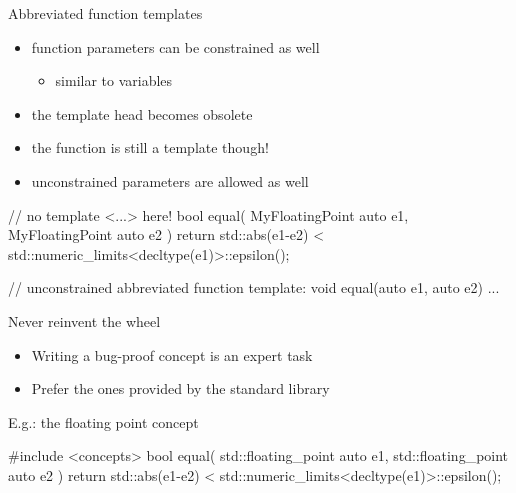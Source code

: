 \begin{frame}[fragile]
    \begin{block}{Abbreviated function templates}
      \begin{itemize}
        \item function parameters can be constrained as well
        \begin{itemize}
          \item similar to variables
        \end{itemize}
        \item the template head becomes obsolete
        \item the function is still a template though!
        \item unconstrained  parameters are allowed as well
      \end{itemize}
    \end{block}
    \begin{exampleblock}{}
      \small
      \begin{cppcode*}{}
      // no template <...> here!
      bool equal( MyFloatingPoint auto e1,
                  MyFloatingPoint auto e2 ) {
        return std::abs(e1-e2) <
               std::numeric_limits<decltype(e1)>::epsilon();
      }

      // unconstrained abbreviated function template:
      void equal(auto e1, auto e2) { ... }
      \end{cppcode*}
    \end{exampleblock}
\end{frame}

\begin{frame}[fragile]
    \begin{block}{Never reinvent the wheel}
      \begin{itemize}
        \item Writing a bug-proof concept is an expert task
        \item Prefer the ones provided by the standard library
      \end{itemize}
    \end{block}
    \begin{exampleblock}{E.g.: the floating point concept}
      \small
      \begin{cppcode*}{}
      #include <concepts>
      bool equal( std::floating_point auto e1,
                  std::floating_point auto e2 ) {
        return std::abs(e1-e2) <
               std::numeric_limits<decltype(e1)>::epsilon();
      }
      \end{cppcode*}
    \end{exampleblock}
\end{frame}

